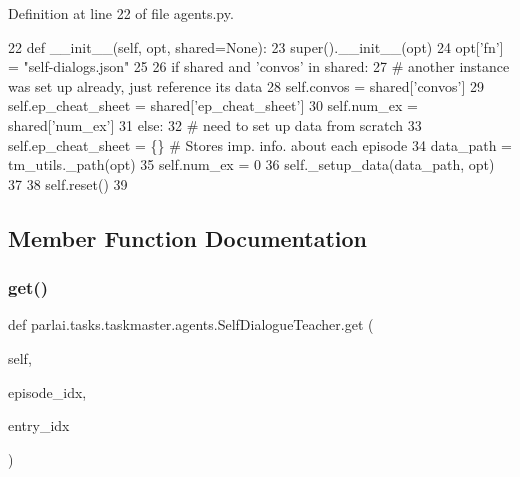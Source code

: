 Definition at line 22 of file agents.\+py.


\begin{DoxyCode}
22     \textcolor{keyword}{def }\_\_init\_\_(self, opt, shared=None):
23         super().\_\_init\_\_(opt)
24         opt[\textcolor{stringliteral}{'fn'}] = \textcolor{stringliteral}{"self-dialogs.json"}
25 
26         \textcolor{keywordflow}{if} shared \textcolor{keywordflow}{and} \textcolor{stringliteral}{'convos'} \textcolor{keywordflow}{in} shared:
27             \textcolor{comment}{# another instance was set up already, just reference its data}
28             self.convos = shared[\textcolor{stringliteral}{'convos'}]
29             self.ep\_cheat\_sheet = shared[\textcolor{stringliteral}{'ep\_cheat\_sheet'}]
30             self.num\_ex = shared[\textcolor{stringliteral}{'num\_ex'}]
31         \textcolor{keywordflow}{else}:
32             \textcolor{comment}{# need to set up data from scratch}
33             self.ep\_cheat\_sheet = \{\}  \textcolor{comment}{# Stores imp. info. about each episode}
34             data\_path = tm\_utils.\_path(opt)
35             self.num\_ex = 0
36             self.\_setup\_data(data\_path, opt)
37 
38         self.reset()
39 
\end{DoxyCode}


\subsection{Member Function Documentation}
\mbox{\label{classparlai_1_1tasks_1_1taskmaster_1_1agents_1_1SelfDialogueTeacher_a328edd2f9d9681f6e1671b91c81046e5}} 
\subsubsection{\texorpdfstring{get()}{get()}}
{\footnotesize\ttfamily def parlai.\+tasks.\+taskmaster.\+agents.\+Self\+Dialogue\+Teacher.\+get (\begin{DoxyParamCaption}\item[{}]{self,  }\item[{}]{episode\+\_\+idx,  }\item[{}]{entry\+\_\+idx }\end{DoxyParamCaption})}



